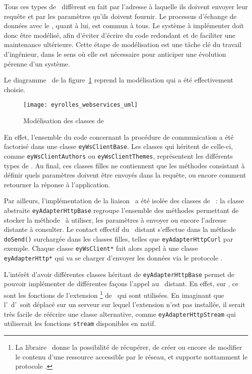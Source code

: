 Tous ces types de \aws\ diffèrent en fait par l'adresse à laquelle ils doivent envoyer leur requête et par les paramètres qu'ils doivent fournir. Le processus d'échange de données avec le \alotun, quant à lui, est commun à tous. Le système à implémenter doit donc être modélisé, afin d'éviter d'écrire du code redondant et de faciliter une maintenance ultérieure. Cette étape de modélisation est une tâche clé du travail d'ingénieur, dans le sens où elle est nécessaire pour anticiper une évolution pérenne d'un système.

Le diagramme \auml\ de la figure~\ref{figure:eyrolles_webservices_uml} reprend la modélisation qui a été effectivement choisie.

\begin{figure}
	\centering
	\texttt{[image: eyrolles\_webservices\_uml]}
	\caption{Modélisation des classes de \aws}
	\label{figure:eyrolles_webservices_uml}
\end{figure}

En effet, l'ensemble du code concernant la procédure de communication a été factorisé dans une classe \texttt{eyWsClientBase}. Les classes qui héritent de celle-ci, comme \texttt{eyWsClientAuthors} ou \texttt{eyWsClientThemes}, représentent les différents types de \aws. Au final, ces classes filles ne contiennent que les méthodes consistant à définir quels paramètres doivent être envoyés dans la requête, ou encore comment retourner la réponse à l'application.

Par ailleurs, l'implémentation de la liaison \ahttp\ a été isolée des classes de \aws\ : la classe abstraite \texttt{eyAdapterHttpBase} regroupe l'ensemble des méthodes permettant de stocker la méthode \ahttp\ à utiliser, les paramètres à envoyer ou encore l'adresse distante à consulter. Le contact effectif du \aws\ distant s'effectue dans la méthode \texttt{doSend()} surchargée dans les classes filles, telles que \texttt{eyAdapterHttpCurl} par exemple. Chaque classe \texttt{eyWsClient*} fait alors appel à une classe \texttt{eyAdapterHttp*} qui va se charger d'envoyer les données via le protocole \ahttp.

L'intérêt d'avoir différentes classes héritant de \texttt{eyAdapterHttpBase} permet de pouvoir implémenter de différentes façons l'appel au \aws\ distant. En effet, sur \aey, ce sont les fonctions de l'extension \acurl\footnote{La libraire \acurl\ donne la possibilité de récupérer, de créer ou encore de modifier le contenu d'une ressource accessible par le réseau, et supporte nottamment le protocole \ahttp.} de \aphp\ qui sont utilisées. En imaginant que l'\aintranet\ d'\aey\ soit déplacé sur un serveur sur lequel l'extension n'est pas installée, il serait très facile de réécrire une classe alternative, comme \texttt{eyAdapterHttpStream} qui utiliserait les fonctions \texttt{stream} disponibles en natif.

